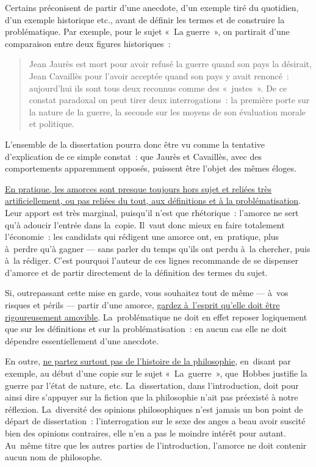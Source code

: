 \documentclass[a4paper,12pt]{report}
\begin{document}
Certains préconisent de partir d'une anecdote, d'un exemple tiré du
quotidien, d'un exemple historique etc., avant de définir les termes et
de construire la problématique. Par exemple, pour le sujet « La
guerre », on partirait d'une comparaison entre deux figures
historiques :
\begin{quote}
Jean Jaurès est mort pour avoir refusé la guerre quand son pays la
désirait, Jean Cavaillès pour l'avoir acceptée quand son pays y avait
renoncé : aujourd'hui ils sont tous deux reconnus comme des « justes ».
De ce constat paradoxal on peut tirer deux interrogations : la
première porte sur la nature de la guerre, la seconde sur les moyens
de son évaluation morale et politique.
\end{quote}
L'ensemble de la dissertation pourra donc être vu comme la tentative
d'explication de ce simple constat : que Jaurès et Cavaillès, avec des
comportements apparemment opposés, puissent être l'objet des mêmes
éloges.

\uline{En pratique, les amorces sont presque toujours hors sujet et reliées
très artificiellement, ou pas reliées du tout, aux définitions et à la
problématisation}. Leur apport est très marginal, puisqu'il n'est que
rhétorique : l'amorce ne sert qu'à adoucir l'entrée dans la copie.
Il vaut donc mieux en faire totalement l'économie : les candidats qui
rédigent une amorce ont, en pratique, plus à perdre qu'à gagner --- sans
parler du temps qu'ils ont perdu à la chercher, puis à la rédiger. C'est
pourquoi l'auteur de ces lignes recommande de se dispenser d'amorce et
de partir directement de la définition des termes du sujet.

Si, outrepassant cette mise en garde, vous souhaitez tout de même ---
à vos risques et périls --- partir d'une amorce, \uline{gardez à l'esprit
qu'elle doit être rigoureusement amovible}. La problématique ne doit en
effet reposer logiquement que sur les définitions et sur la
problématisation : en aucun cas elle ne doit dépendre essentiellement
d'une anecdote.

En outre, \uline{ne partez surtout pas de l'histoire de la philosophie},
en disant par exemple, au début d'une copie sur le sujet « La guerre »,
que Hobbes justifie la guerre par l'état de nature, etc.
La dissertation, dans l'introduction, doit pour ainsi dire s'appuyer sur
la fiction que la philosophie n'ait pas préexisté à notre réflexion.
La diversité des opinions philosophiques n'est jamais un bon point de
départ de dissertation : l'interrogation sur le sexe des anges a beau
avoir suscité bien des opinions contraires, elle n'en a pas le moindre
intérêt pour autant. Au même titre que les autres parties de
l'introduction, l'amorce ne doit contenir aucun nom de philosophe.
\end{document}

